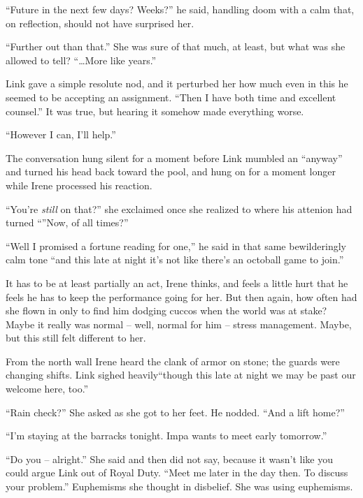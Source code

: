 \documentclass[../FGP.tex]{subfiles}
\begin{document}
\begin{fragment}
``Future in the next few days? Weeks?'' he said, handling doom with a calm that, on reflection, should not have surprised her.

``Further out than that.'' She was sure of that much, at least, but what was she allowed to tell? ``\ldots More like years.''

Link gave a simple resolute nod, and it perturbed her how much even in this he seemed to be accepting an assignment. 
``Then I have both time and excellent counsel.'' 
It was true, but hearing it somehow made everything worse. 

``However I can, I'll help.''

The conversation hung silent for a moment before Link mumbled an ``anyway'' and turned his head back toward the pool, and hung on for a moment longer while Irene processed his reaction. 

``You're \emph{still} on that?'' she exclaimed once she realized to where his attenion had turned ``''Now, of all times?'' 

``Well I promised a fortune reading for one,'' he said in that same bewilderingly calm tone ``and this late at night it's not like there's an octoball game to join.''

It has to be at least partially an act, Irene thinks, and feels a little hurt that he feels he has to keep the performance going for her. But then again, how often had she flown in only to find him dodging cuccos when the world was at stake? Maybe it really was normal -- well, normal for him -- stress management. Maybe, but this still felt different to her.

From the north wall Irene heard the clank of armor on stone; the guards were changing shifts. Link sighed heavily``though this late at night we may be past our welcome here, too.''

``Rain check?'' She asked as she got to her feet. He nodded. ``And a lift home?''

``I'm staying at the barracks tonight. Impa wants to meet early tomorrow.''

``Do you -- alright.'' She said and then did not say, because it wasn't like you could argue Link out of Royal Duty. ``Meet me later in the day then. To discuss your problem.'' Euphemisms she thought in disbelief. She was using euphemisms. 


\end{fragment}
\end{document}

